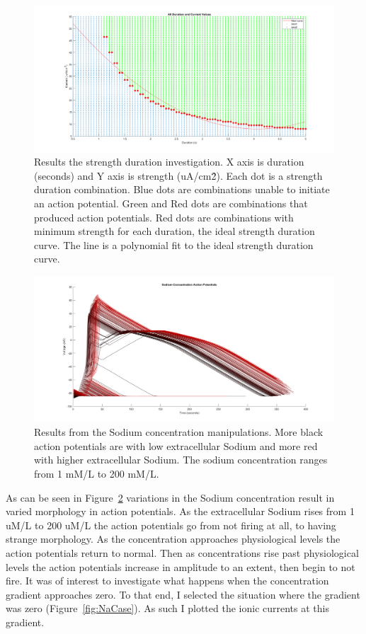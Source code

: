 \documentclass[12pt]{article}
\begin{document}
\begin{figure}[H]
	
	\centering	
	\includegraphics[width = 1\textwidth]{StrengthDuration.png}
	\caption{ Results the strength duration investigation. X axis is duration (seconds) and Y axis is strength (uA/cm\^2). Each dot is a strength duration combination. Blue dots are combinations unable to initiate an action potential. Green and Red dots are combinations that produced action potentials. Red dots are combinations with minimum strength for each duration, the ideal strength duration curve. The line is a polynomial fit to the ideal strength duration curve.  }
	\label{fig:StrDur}
\end{figure}

\begin{figure}[H]
	
	\centering	
	\includegraphics[width = 1\textwidth]{NaAPs.png}
	\caption{ Results from the Sodium concentration manipulations. More black action potentials are with low extracellular Sodium and more red with higher extracellular Sodium. The sodium concentration ranges from 1 mM/L to 200 mM/L. }
	\label{fig:AllNaAP}
\end{figure}

\par{}
As can be seen in Figure~\ref{fig:AllNaAP} variations in the Sodium concentration result in varied morphology in action potentials. As the extracellular Sodium rises from 1 uM/L to 200 uM/L the action potentials go from not firing at all, to having strange morphology. As the concentration approaches physiological levels the action potentials return to normal. Then as concentrations rise past physiological levels the action potentials increase in amplitude to an extent, then begin to not fire. It was of interest to investigate what happens when the concentration gradient approaches zero. To that end, I selected the situation where the gradient was zero (Figure~\ref{fig:NaCase}). As such I plotted the ionic currents at this gradient.
\end{document}
